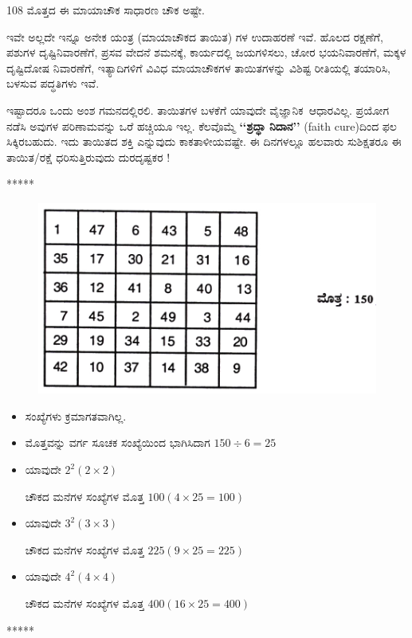108 ಮೊತ್ತದ ಈ ಮಾಯಾಚೌಕ ಸಾಧಾರಣ ಚೌಕ ಅಷ್ಟೇ.

ಇವೇ ಅಲ್ಲದೇ ಇನ್ನೂ ಅನೇಕ ಯಂತ್ರ (ಮಾಯಾಚೌಕದ ತಾಯಿತ) ಗಳ ಉದಾಹರಣೆ ಇವೆ. ಹೊಲದ ರಕ್ಷಣೆಗೆ, ಪಶುಗಳ ದೃಷ್ಟಿನಿವಾರಣೆಗೆ, ಪ್ರಸವ ವೇದನೆ ಶಮನಕ್ಕೆ, ಕಾರ್ಯ\-ದಲ್ಲಿ  ಜಯಗಳಿಸಲು, ಚೋರ ಭಯನಿವಾರಣೆಗೆ, ಮಕ್ಕಳ ದೃಷ್ಟಿದೋಷ ನಿವಾರಣೆಗೆ, ಇತ್ಯಾದಿ\-ಗಳಿಗೆ ವಿವಿಧ ಮಾಯಾಚೌಕಗಳ ತಾಯಿತಗಳನ್ನು ವಿಶಿಷ್ಟ ರೀತಿಯಲ್ಲಿ ತಯಾರಿಸಿ, ಬಳಸುವ ಪದ್ಧತಿ\-ಗಳು ಇವೆ.

ಇಷ್ಟಾದರೂ ಒಂದು ಅಂಶ ಗಮನದಲ್ಲಿರಲಿ. ತಾಯಿತಗಳ ಬಳಕೆಗೆ ಯಾವುದೇ \hbox{ವೈಜ್ಞಾನಿಕ ಆಧಾರವಿಲ್ಲ.} ಪ್ರಯೋಗ ನಡೆಸಿ ಅವುಗಳ ಪರಿಣಾಮವನ್ನು ಒರೆ ಹಚ್ಚಿಯೂ ಇಲ್ಲ. ಕೆಲವೊಮ್ಮೆ \textbf{‘‘ಶ್ರದ್ಧಾ ನಿದಾನ’’} (faith cure)ದಿಂದ ಫಲ ಸಿಕ್ಕಿರಬಹುದು. ಇದು \hbox{ತಾಯಿತದ} ಶಕ್ತಿ ಎನ್ನುವುದು ಕಾಕತಾಳೀಯವಷ್ಟೇ. ಈ ದಿನಗಳಲ್ಲೂ ಹಲವಾರು ಸುಶಿಕ್ಷತರೂ ಈ \hbox{ತಾಯಿತ/ರಕ್ಷೆ} ಧರಿಸುತ್ತಿರುವುದು ದುರದೃಷ್ಟಕರ !
\begin{center}
*****
\end{center}

\begin{figure}[H]
\includegraphics{src/figures/chap11/fig11-5.jpg}
\end{figure}
\begin{itemize}
	\item ಸಂಖ್ಯೆಗಳು ಕ್ರಮಾಗತವಾಗಿಲ್ಲ.\smallskip
	\item ಮೊತ್ತವನ್ನು ವರ್ಗ ಸೂಚಕ ಸಂಖ್ಯೆಯಿಂದ ಭಾಗಿಸಿದಾಗ $150 \div 6  = 25$\smallskip
	\item ಯಾವುದೇ $2^2 (2 \times 2)$ 
	
	ಚೌಕದ ಮನೆಗಳ ಸಂಖ್ಯೆಗಳ ಮೊತ್ತ $100 (4 \times 25 = 100)$\smallskip
	\item ಯಾವುದೇ $3^2 (3 \times 3)$ 
	
	ಚೌಕದ ಮನೆಗಳ ಸಂಖ್ಯೆಗಳ ಮೊತ್ತ $225 (9 \times 25 = 225)$\smallskip
	\item ಯಾವುದೇ $4^2 (4 \times 4)$ 
	
	ಚೌಕದ ಮನೆಗಳ ಸಂಖ್ಯೆಗಳ ಮೊತ್ತ $400 (16 \times 25 = 400)$\smallskip
\end{itemize}
\begin{center}
*****
\end{center}
